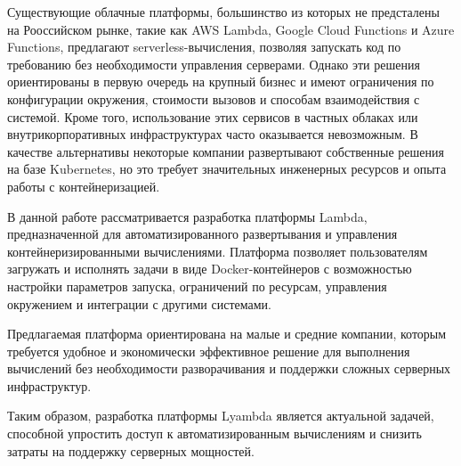 Существующие облачные платформы, большинство из которых не предсталены на Рооссийском рынке, такие как AWS Lambda, Google Cloud Functions и Azure Functions, предлагают serverless-вычисления, позволяя запускать код по требованию без необходимости управления серверами.
Однако эти решения ориентированы в первую очередь на крупный бизнес и имеют ограничения по конфигурации окружения, стоимости вызовов и способам взаимодействия с системой. Кроме того, использование этих сервисов в частных облаках или внутрикорпоративных инфраструктурах часто оказывается невозможным.
В качестве альтернативы некоторые компании развертывают собственные решения на базе Kubernetes, но это требует значительных инженерных ресурсов и опыта работы с контейнеризацией.

В данной работе рассматривается разработка платформы Lambda, предназначенной для автоматизированного развертывания и управления контейнеризированными вычислениями.
Платформа позволяет пользователям загружать и исполнять задачи в виде Docker-контейнеров с возможностью настройки параметров запуска, ограничений по ресурсам, управления окружением и интеграции с другими системами.

Предлагаемая платформа ориентирована на малые и средние компании, которым требуется удобное и экономически эффективное решение для выполнения вычислений без необходимости разворачивания и поддержки сложных серверных инфраструктур.

Таким образом, разработка платформы Lyambda является актуальной задачей, способной упростить доступ к автоматизированным вычислениям и снизить затраты на поддержку серверных мощностей.

